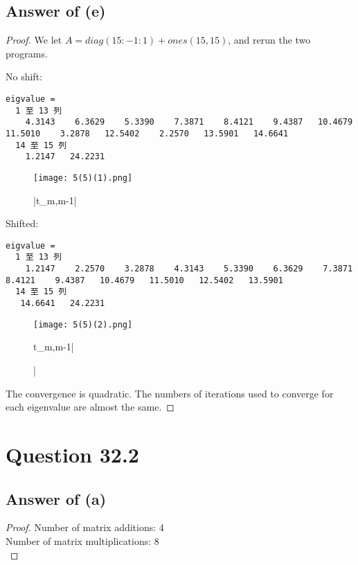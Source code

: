 \documentclass[letterpaper,11pt\iffalse ,draft\fi]{article}
\begin{document}
\subsection*{Answer of (e)}
\begin{proof}

We let $A = diag(15:-1:1) + ones(15,15)$, and rerun the two programs.

No shift:

\begin{lstlisting}
eigvalue =
  1 至 13 列
    4.3143    6.3629    5.3390    7.3871    8.4121    9.4387   10.4679   11.5010    3.2878   12.5402    2.2570   13.5901   14.6641
  14 至 15 列
    1.2147   24.2231
\end{lstlisting}

\begin{figure}[htb] \centering 
    \texttt{[image: 5(5)(1).png]}
    \caption{|t_{m,m-1}|}
    \end{figure}
    

Shifted:

\begin{lstlisting}
eigvalue =
  1 至 13 列
    1.2147    2.2570    3.2878    4.3143    5.3390    6.3629    7.3871    8.4121    9.4387   10.4679   11.5010   12.5402   13.5901
  14 至 15 列
   14.6641   24.2231
\end{lstlisting}

\begin{figure}[htb] \centering 
    \texttt{[image: 5(5)(2).png]}
    \caption|{t_{m,m-1}|}
    \end{figure}
    
The convergence is quadratic. The numbers of iterations used to converge for each eigenvalue are almost the same.

\end{proof}

\newpage

\section*{Question 32.2}

\subsection*{Answer of (a)}
\begin{proof}
Number of matrix additions: 4 \\
Number of matrix multiplications: 8 \\
\end{proof}
\end{document}
